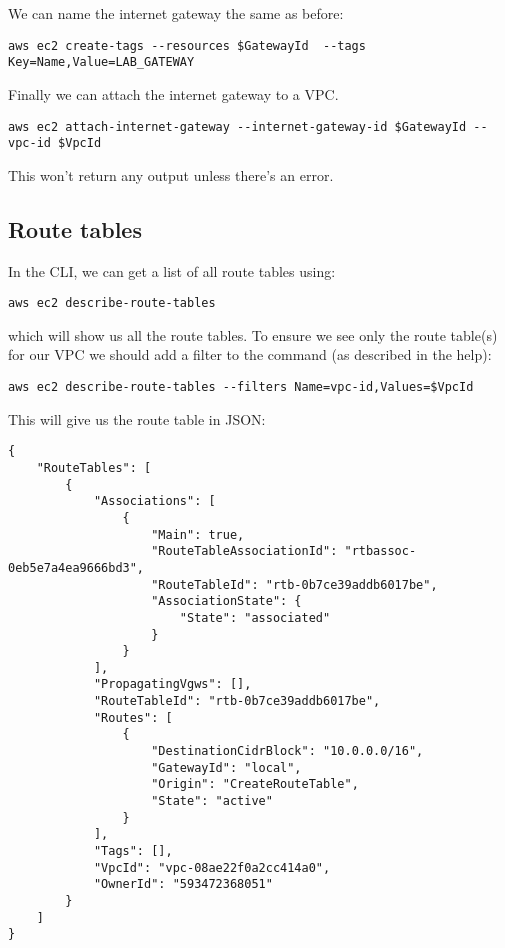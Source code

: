 \documentclass{pgnotes}
\begin{document}
We can name the internet gateway the same as before:

\begin{verbatim}
aws ec2 create-tags --resources $GatewayId  --tags Key=Name,Value=LAB_GATEWAY
\end{verbatim}

Finally we can attach the internet gateway to a VPC.

\begin{verbatim}
aws ec2 attach-internet-gateway --internet-gateway-id $GatewayId --vpc-id $VpcId
\end{verbatim}

This won't return any output unless there's an error.

\subsection{Route tables}
\label{route-tables}

In the CLI, we can get a list of all route tables using:

\begin{verbatim}
aws ec2 describe-route-tables
\end{verbatim}

which will show us all the route tables. To ensure we see only the route
table(s) for our VPC we should add a filter to the command (as described
in the help):

\begin{verbatim}
aws ec2 describe-route-tables --filters Name=vpc-id,Values=$VpcId
\end{verbatim}

This will give us the route table in JSON:

\begin{verbatim}
{
    "RouteTables": [
        {
            "Associations": [
                {
                    "Main": true,
                    "RouteTableAssociationId": "rtbassoc-0eb5e7a4ea9666bd3",
                    "RouteTableId": "rtb-0b7ce39addb6017be",
                    "AssociationState": {
                        "State": "associated"
                    }
                }
            ],
            "PropagatingVgws": [],
            "RouteTableId": "rtb-0b7ce39addb6017be",
            "Routes": [
                {
                    "DestinationCidrBlock": "10.0.0.0/16",
                    "GatewayId": "local",
                    "Origin": "CreateRouteTable",
                    "State": "active"
                }
            ],
            "Tags": [],
            "VpcId": "vpc-08ae22f0a2cc414a0",
            "OwnerId": "593472368051"
        }
    ]
}
\end{verbatim}
\end{document}

